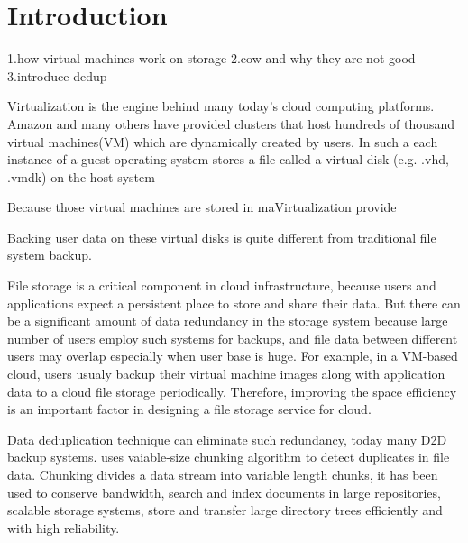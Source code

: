 \section{Introduction}

1.how virtual machines work on storage
2.cow and why they are not good
3.introduce dedup

Virtualization is the engine behind many today's cloud computing platforms.
Amazon and many others have provided clusters that host 
hundreds of thousand virtual machines(VM) which are dynamically created
by users. In such a 
each instance of a guest operating system stores a
file called a virtual disk (e.g. .vhd, .vmdk) on the host system

Because those virtual machines are stored in  maVirtualization provide

Backing user data on these virtual disks is quite different from traditional file system backup.
 
File storage is a critical component in cloud infrastructure, because users and applications expect a  
persistent place to store and share their data. 
But there can be a significant amount of data redundancy in the storage system
 because large number of users employ such systems for backups, 
and file data between different users may overlap especially when user base is huge. 
For example, in a VM-based cloud, users usualy backup their virtual machine images along with application data 
to a cloud file storage periodically. 
Therefore, improving the space efficiency is an 
important factor in designing a file storage service for cloud.

Data deduplication technique can eliminate such redundancy,
today many D2D backup systems\cite{emc_avamar}\cite{datadomain_whitepaper}.
uses vaiable-size chunking algorithm to detect duplicates in file data.
Chunking divides a data stream into variable length chunks, it has been used to conserve bandwidth\cite{lbfs01}, 
search and index documents in large repositories\cite{bhag07}, scalable storage systems\cite{hydrastor09}, 
store and transfer large directory trees efficiently and with high reliability\cite{jumbo07}.


